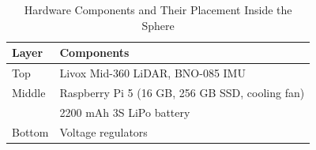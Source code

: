 \documentclass[conference]{IEEEtran}
\begin{document}
\begin{table}
\centering
\caption{Hardware Components and Their Placement Inside the Sphere}
\label{tab:hardware_components}
\begin{tabularx}{\linewidth}{@{}l X@{}}
\toprule
\textbf{Layer} & \textbf{Components} \\
\midrule
Top    & Livox Mid-360 LiDAR, BNO-085 IMU \\
Middle & Raspberry Pi 5 (16 GB, 256 GB SSD, cooling fan) \\
       & 2200 mAh 3S LiPo battery \\
Bottom & Voltage regulators \\
\bottomrule
\end{tabularx}
\vspace{-1em}
\end{table}
\end{document}
